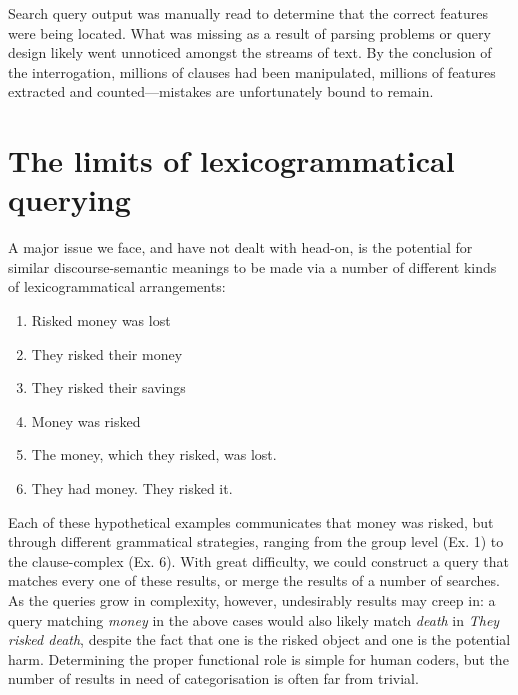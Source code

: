 	 Search query output was manually read to determine that the correct features were being located. What was missing as a result of parsing problems or query design likely went unnoticed amongst the streams of text. By the conclusion of the interrogation, millions of clauses had been manipulated, millions of features extracted and counted---mistakes are unfortunately bound to remain.

\section{The limits of lexicogrammatical querying}

        A major issue we face, and have not dealt with head-on, is the potential for similar discourse-semantic meanings to be made via a number of different kinds of lexicogrammatical arrangements:

        \begin{enumerate} [before=\itshape,font=\normalfont] \setlength\itemsep{0em} \small
            \item Risked money was lost
            \item They risked their money
            \item They risked their savings
            \item Money was risked
            \item The money, which they risked, was lost.
            \item They had money. They risked it.
        \end{enumerate}

        Each of these hypothetical examples communicates that money was risked, but through different grammatical strategies, ranging from the group level (Ex. 1) to the clause-complex (Ex. 6). With great difficulty, we could construct a query that matches every one of these results, or merge the results of a number of searches. As the queries grow in complexity, however, undesirably results may creep in: a query matching \emph{money} in the above cases would also likely match \emph{death} in \emph{They risked death}, despite the fact that one is the risked object and one is the potential harm. Determining the proper functional role is simple for human coders, but the number of results in need of categorisation is often far from trivial. 


